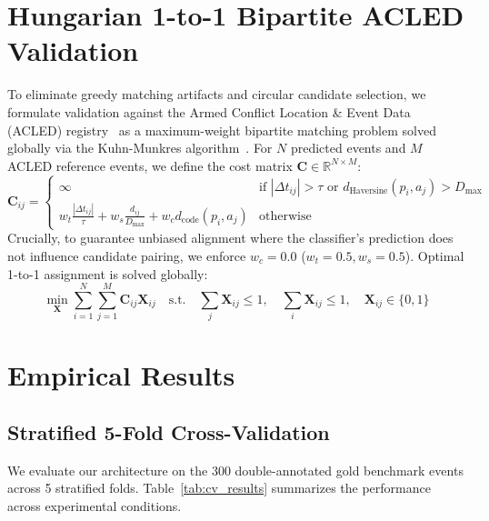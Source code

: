 \documentclass[11pt,a4paper]{article}
\begin{document}
\section{Hungarian 1-to-1 Bipartite ACLED Validation}
To eliminate greedy matching artifacts and circular candidate selection, we formulate validation against the Armed Conflict Location \& Event Data (ACLED) registry~\cite{raleigh2010introducing} as a maximum-weight bipartite matching problem solved globally via the Kuhn-Munkres algorithm~\cite{kuhn1955hungarian,munkres1957algorithms}. For $N$ predicted events and $M$ ACLED reference events, we define the cost matrix $\mathbf{C} \in \mathbb{R}^{N \times M}$:
\begin{equation}
    \mathbf{C}_{ij} = \begin{cases}
        \infty & \text{if } |\Delta t_{ij}| > \tau \text{ or } d_{\text{Haversine}}(p_i, a_j) > D_{\max} \\
        w_t \frac{|\Delta t_{ij}|}{\tau} + w_s \frac{d_{ij}}{D_{\max}} + w_c d_{\text{code}}(p_i, a_j) & \text{otherwise}
    \end{cases}
\end{equation}
Crucially, to guarantee unbiased alignment where the classifier's prediction does not influence candidate pairing, we enforce $w_c = 0.0$ ($w_t = 0.5, w_s = 0.5$). Optimal 1-to-1 assignment is solved globally:
\begin{equation}
    \min_{\mathbf{X}} \sum_{i=1}^N \sum_{j=1}^M \mathbf{C}_{ij} \mathbf{X}_{ij} \quad \text{s.t.} \quad \sum_{j} \mathbf{X}_{ij} \le 1, \quad \sum_{i} \mathbf{X}_{ij} \le 1, \quad \mathbf{X}_{ij} \in \{0, 1\}
\end{equation}

\section{Empirical Results}

\subsection{Stratified 5-Fold Cross-Validation}
We evaluate our architecture on the 300 double-annotated gold benchmark events across 5 stratified folds. Table~\ref{tab:cv_results} summarizes the performance across experimental conditions.
\end{document}

